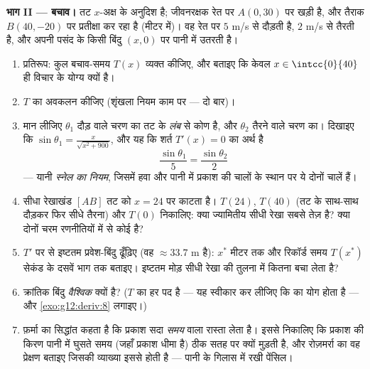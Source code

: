 \begin{problem}
\medskip
\noindent\textbf{भाग II --- बचाव।}
तट $x$-अक्ष के अनुदिश है; जीवनरक्षक रेत पर $A(0, 30)$ पर खड़ी है, और तैराक $B(40, -20)$
पर प्रतीक्षा कर रहा है (मीटर में)। वह रेत पर $5$ m/s से दौड़ती है, $2$
m/s से तैरती है, और अपनी पसंद के किसी बिंदु $(x, 0)$ पर पानी में उतरती है।
\begin{enumerate}[resume]
  \item प्रतिरूप: कुल बचाव-समय $T(x)$ व्यक्त कीजिए, और बताइए कि केवल $x \in \intcc{0}{40}$
        ही विचार के योग्य क्यों है।
  \item $T$ का अवकलन कीजिए (शृंखला नियम काम पर --- दो बार)।
  \item मान लीजिए $\theta_1$ दौड़ वाले चरण का तट के \emph{लंब} से कोण है, और
        $\theta_2$ तैरने वाले चरण का। दिखाइए कि $\sin\theta_1 = \frac{x}{\sqrt{x^2 + 900}}$, और यह कि शर्त $T'(x) = 0$ का
        अर्थ है
        \[
        \frac{\sin\theta_1}{5} = \frac{\sin\theta_2}{2}
        \]
        --- यानी \emph{स्नेल का नियम}, जिसमें हवा और पानी में प्रकाश की
        चालों के स्थान पर ये दोनों चालें हैं।
  \item सीधा रेखाखंड $[AB]$ तट को $x = 24$ पर काटता है। $T(24)$, $T(40)$ (तट के
        साथ-साथ दौड़कर फिर सीधे तैरना) और $T(0)$ निकालिए: क्या ज्यामितीय सीधी
        रेखा सबसे तेज़ है? क्या दोनों चरम रणनीतियों में से कोई है?
  \item $T'$ पर  से इष्टतम प्रवेश-बिंदु ढूँढ़िए (वह $\approx 33.7$ m है):
        $x^*$ मीटर तक और रिकॉर्ड समय $T(x^*)$ सेकंड के दसवें भाग तक बताइए।
        इष्टतम मोड़ सीधी रेखा की तुलना में कितना बचा लेता है?
  \item क्रांतिक बिंदु \emph{वैश्विक}  क्यों है? ($T$ का हर पद
         है --- यह स्वीकार कर लीजिए कि   का योग  होता
        है --- और \cref{exo:g12:deriv:8} लगाइए।)
  \item फ़र्मा का सिद्धांत कहता है कि प्रकाश सदा  \emph{समय} वाला
        रास्ता लेता है। इससे निकालिए कि प्रकाश की किरण पानी में घुसते समय
        (जहाँ प्रकाश धीमा है) ठीक सतह पर क्यों मुड़ती है, और रोज़मर्रा का वह
        प्रेक्षण बताइए जिसकी व्याख्या इससे होती है --- पानी के गिलास में
        रखी पेंसिल।
\end{enumerate}


\end{problem}
